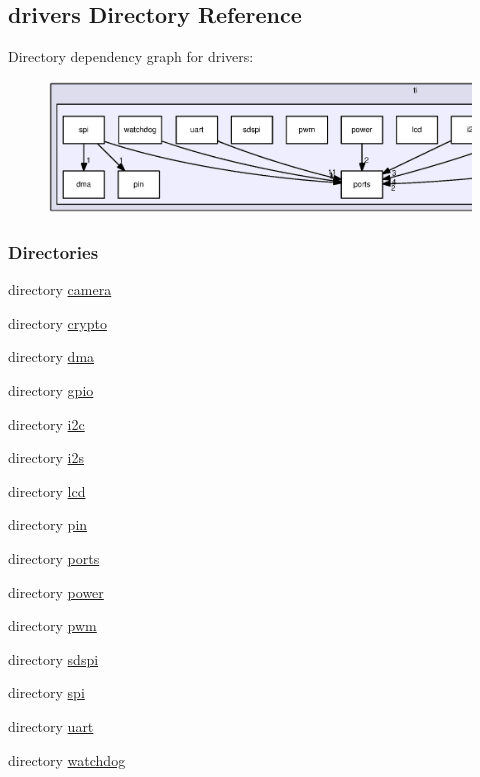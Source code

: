 \subsection{drivers Directory Reference}
\label{dir_91d6028ef0aa1035242bfefa07cd806e}
Directory dependency graph for drivers\+:
\nopagebreak
\begin{figure}[H]
\begin{center}
\leavevmode
\includegraphics[width=350pt]{dir_91d6028ef0aa1035242bfefa07cd806e_dep}
\end{center}
\end{figure}
\subsubsection*{Directories}
\begin{DoxyCompactItemize}
\item 
directory \hyperlink{dir_6a021109eee292c572f9bd13b3b1bb0c}{camera}
\item 
directory \hyperlink{dir_3a38945cad20ef564e72642b4d37e146}{crypto}
\item 
directory \hyperlink{dir_21a0c9d486943857364a519c7b91d02a}{dma}
\item 
directory \hyperlink{dir_fa84d3984843d6793bb3462042564560}{gpio}
\item 
directory \hyperlink{dir_7f11b7105d32a1e996bda272d9ee8afd}{i2c}
\item 
directory \hyperlink{dir_9291a2fd02cdc69926ab855d12f4ed59}{i2s}
\item 
directory \hyperlink{dir_33166de4d01126f67f0d3f22ed870d72}{lcd}
\item 
directory \hyperlink{dir_46f7f2f4474e301c815b85e987532acf}{pin}
\item 
directory \hyperlink{dir_48feca565b02475938ec5531d6e9635b}{ports}
\item 
directory \hyperlink{dir_bd6b5667c675ef84f92abadb1342ff53}{power}
\item 
directory \hyperlink{dir_cad17b9f769a17e178b8a9a80c710d7b}{pwm}
\item 
directory \hyperlink{dir_a597750ad08f17252718b0c5302c803c}{sdspi}
\item 
directory \hyperlink{dir_06c335b5d26ee58949e52d1dc1675348}{spi}
\item 
directory \hyperlink{dir_58d9b6b9b6c44ee981befb907bf69e99}{uart}
\item 
directory \hyperlink{dir_0528fc9ad0c1fcc312759d3069f7868c}{watchdog}
\end{DoxyCompactItemize}
